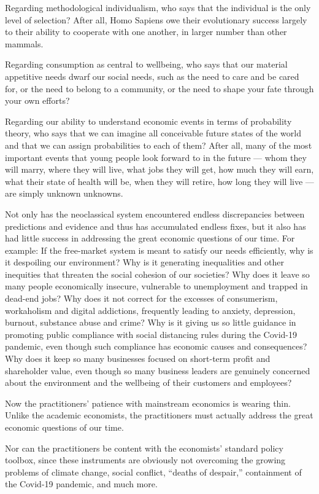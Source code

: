 \documentclass[
]{book}
\begin{document}
Regarding methodological individualism, who says that the individual is the only level of selection? After all, Homo Sapiens owe their evolutionary success largely to their ability to cooperate with one another, in larger number than other mammals.

Regarding consumption as central to wellbeing, who says that our material appetitive needs dwarf our social needs, such as the need to care and be cared for, or the need to belong to a community, or the need to shape your fate through your own efforts?

Regarding our ability to understand economic events in terms of probability theory, who says that we can imagine all conceivable future states of the world and that we can assign probabilities to each of them? After all, many of the most important events that young people look forward to in the future --- whom they will marry, where they will live, what jobs they will get, how much they will earn, what their state of health will be, when they will retire, how long they will live --- are simply unknown unknowns.

Not only has the neoclassical system encountered endless discrepancies between predictions and evidence and thus has accumulated endless fixes, but it also has had little success in addressing the great economic questions of our time. For example: If the free-market system is meant to satisfy our needs efficiently, why is it despoiling our environment? Why is it generating inequalities and other inequities that threaten the social cohesion of our societies? Why does it leave so many people economically insecure, vulnerable to unemployment and trapped in dead-end jobs? Why does it not correct for the excesses of consumerism, workaholism and digital addictions, frequently leading to anxiety, depression, burnout, substance abuse and crime? Why is it giving us so little guidance in promoting public compliance with social distancing rules during the Covid-19 pandemic, even though such compliance has economic causes and consequences? Why does it keep so many businesses focused on short-term profit and shareholder value, even though so many business leaders are genuinely concerned about the environment and the wellbeing of their customers and employees?

Now the practitioners' patience with mainstream economics is wearing thin. Unlike the academic economists, the practitioners must actually address the great economic questions of our time.

Nor can the practitioners be content with the economists' standard policy toolbox, since these instruments are obviously not overcoming the growing problems of climate change, social conflict, ``deaths of despair,'' containment of the Covid-19 pandemic, and much more.
\end{document}
